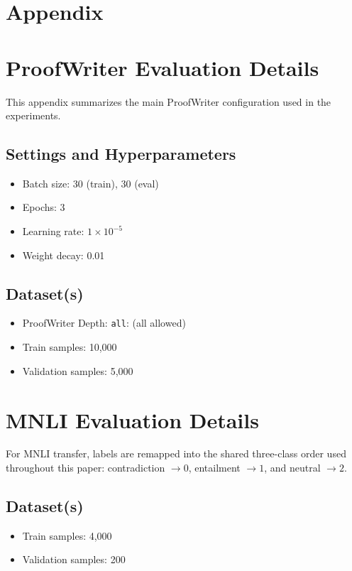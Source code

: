 \documentclass[10pt,twocolumn,letterpaper]{article}
\begin{document}
{\small


}

\appendix
\section*{Appendix}

\setcounter{figure}{0}
\setcounter{table}{0}
\setcounter{equation}{0}
\renewcommand{\thefigure}{A\arabic{figure}}
\renewcommand{\thetable}{A\arabic{table}}
\renewcommand{\theequation}{A\arabic{equation}}

\section{ProofWriter Evaluation Details}
This appendix summarizes the main ProofWriter configuration used in the
experiments.

\subsection{Settings and Hyperparameters}
\begin{itemize}
\item Batch size: 30 (train), 30 (eval)
\item Epochs: 3
\item Learning rate: $1\times10^{-5}$
\item Weight decay: 0.01
\end{itemize}

\subsection{Dataset(s)}
\begin{itemize}
\item ProofWriter Depth: \texttt{all}: (all allowed)
\item Train samples: 10,000
\item Validation samples: 5,000
\end{itemize}

\section{MNLI Evaluation Details}
For MNLI transfer, labels are remapped into the shared
three-class order used throughout this paper:
contradiction $\rightarrow 0$, entailment $\rightarrow 1$, and
neutral $\rightarrow 2$.

\subsection{Dataset(s)}
\begin{itemize}
\item Train samples: 4,000
\item Validation samples: 200
\end{itemize}
\end{document}
